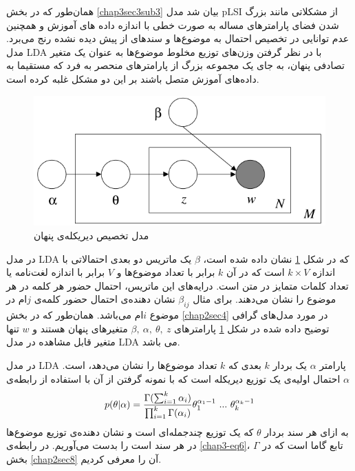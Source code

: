 همان‌طور که در بخش
\ref{chap3sec3sub3}
بیان شد مدل
pLSI
از مشکلاتی مانند بزرگ شدن فضای پارامترهای مساله به صورت خطی‌ با اندازه داده ‌های آموزش و همچنین عدم توانایی در تخصیص احتمال به موضوع‌ها و سند‌های از پیش دیده نشده رنج می‌‌برد. مدل
LDA
با در نظر گرفتن وزن‌های توزیع مخلوط موضوع‌ها به عنوان یک متغیر تصادفی پنهان، به جای یک مجموعه بزرگ از پارامترهای منحصر به فرد که 
مستقیما به داده‌های آموزش متصل باشند بر این دو مشکل غلبه کرده است.
	\begin{figure}[!t]
		\centering
		\includegraphics[scale=0.4]{chap3-img/LDA}
		\caption{مدل تخصیص دیریکله‌ی پنهان \cite{blei2003latent}}
		\label{chap3-fig5}
	\end{figure}

در مدل
LDA
که در شکل
\ref{chap3-fig5}
نشان داده شده است،
$\beta$
یک ماتریس دو بعدی احتمالاتی با اندازه
$k \times V$
 است که در آن
$k$
برابر با تعداد موضوع‌ها و
$V$
برابر با اندازه لغت‌نامه‌ یا تعداد کلمات متمایز در متن است. درایه‌های این ماتریس، احتمال حضور هر کلمه در هر موضوع را نشان می‌‌دهند. برای مثال
$\beta_{ij}$
نشان دهنده‌ی احتمال حضور کلمه‌ی
$j$ام
 در موضوع
$i$ام
 می‌باشد. همان‌طور که در بخش
\ref{chap2sec4}
در مورد مدل‌های گرافی توضیح داده شده در شکل
\ref{chap3-fig5}
پارامتر‌های
$\beta,\ \alpha,\ \theta ,\ z$
متغیر‌های پنهان هستند و
$w$
تنها متغیر قابل مشاهده در مدل
LDA
می‌ باشد.

در مدل
LDA
پارامتر
$\alpha$
یک بردار
$k$
بعدی که
$k$
تعداد موضوع‌ها را نشان می‌دهد، است.
$\alpha$
احتمال اولیه‌ی یک توزیع دیریکله است که با نمونه گرفتن از آن با استفاده از رابطه‌ی
\begin{align}
	\centering
	\label{chap3-eq6}
	p(\theta|\alpha) = \dfrac{\Gamma (\sum_{i=1}^{k} \alpha_i)}{\prod_{i=1}^{k} \Gamma(\alpha_i)} \theta_1^{\alpha_1 -1}\ ...\ \theta_k^{\alpha_k -1}
\end{align}
به ازای هر سند بردار
$\theta$
که یک توزیع چندجمله‌ای است و نشان دهنده‌ی توزیع موضوع‌ها در هر سند است را بدست می‌‌آوریم. در رابطه‌ی
\ref{chap3-eq6}، $\Gamma$
تابع گاما است که در بخش
\ref{chap2sec8}
آن را معرفی‌ کردیم.


